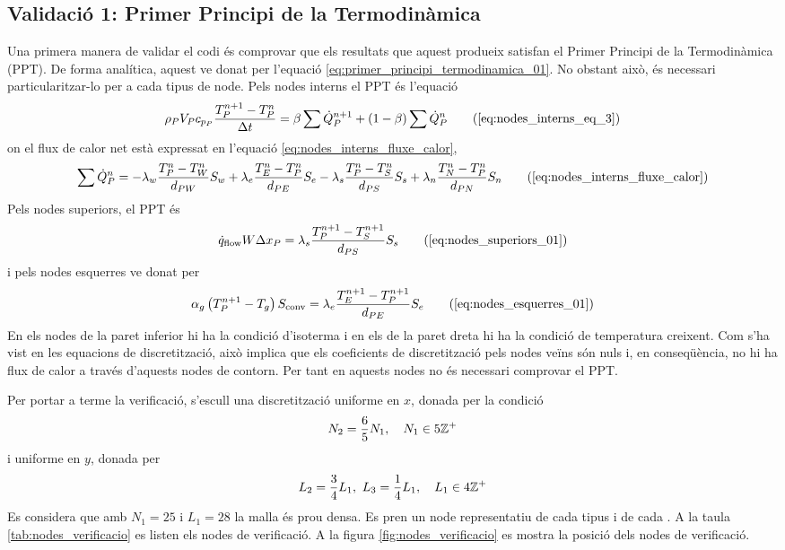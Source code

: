 
\subsection{Validació 1: Primer Principi de la Termodinàmica} \label{sec:validacio_01}

Una primera manera de validar el codi és comprovar que els resultats que aquest produeix satisfan el Primer Principi de la Termodinàmica (PPT). De forma analítica, aquest ve donat per l'equació \eqref{eq:primer_principi_termodinamica_01}. No obstant això, és necessari particularitzar-lo per a cada tipus de node. Pels nodes interns el PPT és l'equació
\begin{equation}
	\rho_P V_P c_{p_P} \frac{T_P^{n+1} - T_P^n}{\Delta t} = 
	\beta \sum \dot{Q}_P^{n+1} + (1 - \beta) \sum \dot{Q}_P^n	
	\tag{\ref{eq:nodes_interns_eq_3}}
\end{equation}
on el flux de calor net està expressat en l'equació \eqref{eq:nodes_interns_fluxe_calor},
\begin{equation}
	\sum \dot{Q}_P^n =
	- \lambda_w \frac{T_P^n - T_W^n}{d_{PW}} S_w 
	+ \lambda_e \frac{T_E^n - T_P^n}{d_{PE}} S_e
	- \lambda_s \frac{T_P^n - T_S^n}{d_{PS}} S_s 
	+ \lambda_n \frac{T_N^n - T_P^n}{d_{PN}} S_n \tag{\ref{eq:nodes_interns_fluxe_calor}}
\end{equation}
Pels nodes superiors, el PPT és
\begin{equation} 
	\dot{q}_\text{flow} W \Delta x_P = 
	\lambda_s \frac{T_P^{n+1} - T_S^{n+1}}{d_{PS}} S_s
	\tag{\ref{eq:nodes_superiors_01}}
\end{equation}
i pels nodes esquerres ve donat per
\begin{equation}
	\alpha_g \left( T_P^{n+1} - T_g \right) S_\text{conv} = 
	\lambda_e \frac{T_E^{n+1} - T_P^{n+1}}{d_{PE}} S_e
	\tag{\ref{eq:nodes_esquerres_01}}
\end{equation}
En els nodes de la paret inferior hi ha la condició d'isoterma i en els de la paret dreta hi ha la condició de temperatura creixent. Com s'ha vist en les equacions de discretització, això implica que els coeficients de discretització pels nodes veïns són nuls i, en conseqüència, no hi ha flux de calor a través d'aquests nodes de contorn. Per tant en aquests nodes no és necessari comprovar el PPT.

Per portar a terme la verificació, s'escull una discretització uniforme en $x$, donada per la condició
\begin{equation}
	N_2 = \frac{6}{5} N_1, \quad N_1 \in 5 \mathbb{Z}^+
\end{equation}
i uniforme en $y$, donada per
\begin{equation}
	L_2 = \frac{3}{4} L_1, \ 
	L_3 = \frac{1}{4} L_1, \quad
	L_1 \in 4 \z^+
\end{equation}
Es considera que amb $N_1 = 25$ i $L_1 = 28$ la malla és prou densa. Es pren un node representatiu de cada tipus i de cada . A la taula \ref{tab:nodes_verificacio} es listen els nodes de verificació. A la figura \ref{fig:nodes_verificacio} es mostra la posició dels nodes de verificació.

